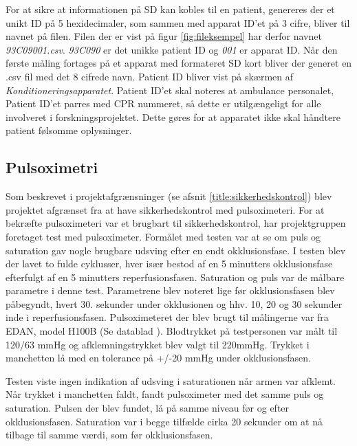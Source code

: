 For at sikre at informationen på SD kan kobles til en patient, genereres der et unikt ID på 5 hexidecimaler, som sammen med apparat ID'et på 3 cifre, bliver til navnet på filen. Filen der er vist på figur \ref{fig:fileksempel} har derfor navnet \textit{93C09001.csv}. \textit{93C090} er det unikke patient ID og \textit{001} er apparat ID. Når den første måling fortages på et apparat med formateret SD kort bliver der generet en .csv fil med det 8 cifrede navn. Patient ID bliver vist på skærmen af \textit{Konditioneringsapparatet}. Patient ID'et skal noteres at ambulance personalet, Patient ID'et parres med CPR nummeret, så dette er utilgængeligt for alle involveret i forskningsprojektet. Dette gøres for at apparatet ikke skal håndtere patient følsomme oplysninger.

\subsection{Pulsoximetri} \label{title:pulsOxi}
Som beskrevet i projektafgrænsninger (se afsnit \ref{title:sikkerhedskontrol}) blev projektet afgrænset fra at have sikkerhedskontrol med pulsoximeteri. For at bekræfte pulsoximeteri var et brugbart til sikkerhedskontrol, har projektgruppen foretaget test med pulsoximeter. Formålet med testen var at se om puls og saturation gav nogle brugbare udsving efter en endt okklusionsfase. I testen blev der lavet to fulde cyklusser, hver især bestod af en 5 minutters okklusionsfase efterfulgt af en 5 minutters reperfusionsfasen. Saturation og puls var de målbare parametre i denne test. Parametrene blev noteret lige før okklusionsfasen blev påbegyndt, hvert 30. sekunder under okklusionen og hhv. 10, 20 og 30 sekunder inde i reperfusionsfasen. Pulsoximeteret der blev brugt til målingerne var fra EDAN, model H100B (Se datablad \cite{RefWorks:30}). Blodtrykket på testpersonen var målt til 120/63 mmHg og afklemningstrykket blev valgt til 220mmHg. Trykket i manchetten lå med en tolerance på +/-20 mmHg under okklusionsfasen. 

Testen viste ingen indikation af udsving i saturationen når armen var afklemt. Når trykket i manchetten faldt, fandt pulsoximeter med det samme puls og saturation. Pulsen der blev fundet, lå på samme niveau før og efter okklusionsfasen. Saturation var i begge tilfælde cirka 20 sekunder om at nå tilbage til samme værdi, som før okklusionsfasen. 

